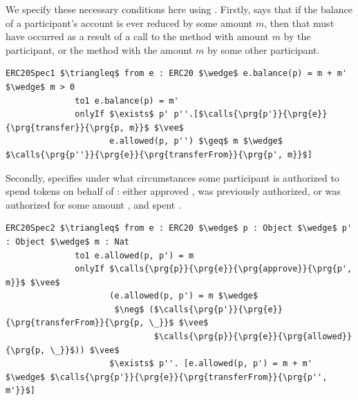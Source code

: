 We specify these necessary conditions here using \Chainmail. Firstly,  
says that if the balance of a participant's account is ever reduced by some amount $m$, then
that must have occurred as a result of a call to the  method with amount $m$ by the participant,
or the  method with the amount $m$ by some other participant.
\begin{lstlisting}[language = Chainmail, mathescape=true, frame=lines]
ERC20Spec1 $\triangleq$ from e : ERC20 $\wedge$ e.balance(p) = m + m' $\wedge$ m > 0
              to1 e.balance(p) = m'
              onlyIf $\exists$ p' p''.[$\calls{\prg{p'}}{\prg{e}}{\prg{transfer}}{\prg{p, m}}$ $\vee$ 
                     e.allowed(p, p'') $\geq$ m $\wedge$ $\calls{\prg{p''}}{\prg{e}}{\prg{transferFrom}}{\prg{p', m}}$]
\end{lstlisting}
Secondly,  specifies under what circumstances some participant  is authorized to 
spend  tokens on behalf of : either  approved ,  was previously authorized,
or  was authorized for some amount , and spent .
\begin{lstlisting}[language = Chainmail, mathescape=true, frame=lines]
ERC20Spec2 $\triangleq$ from e : ERC20 $\wedge$ p : Object $\wedge$ p' : Object $\wedge$ m : Nat
              to1 e.allowed(p, p') = m
              onlyIf $\calls{\prg{p}}{\prg{e}}{\prg{approve}}{\prg{p', m}}$ $\vee$ 
                     (e.allowed(p, p') = m $\wedge$ 
                      $\neg$ ($\calls{\prg{p'}}{\prg{e}}{\prg{transferFrom}}{\prg{p, \_}}$ $\vee$ 
                              $\calls{\prg{p}}{\prg{e}}{\prg{allowed}}{\prg{p, \_}}$)) $\vee$
                     $\exists$ p''. [e.allowed(p, p') = m + m' $\wedge$ $\calls{\prg{p'}}{\prg{e}}{\prg{transferFrom}}{\prg{p'', m'}}$]
\end{lstlisting}

